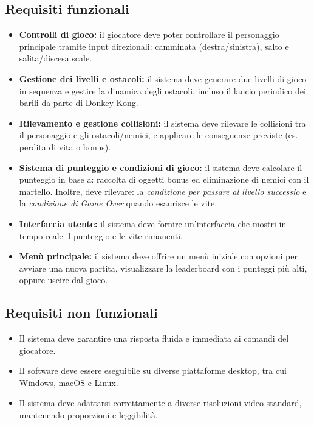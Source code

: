 \documentclass[a4paper,12pt]{report}
\begin{document}
\subsection*{Requisiti funzionali}
\begin{itemize}
	\item \textbf{Controlli di gioco:}
	      il giocatore deve poter controllare il personaggio principale tramite input direzionali: camminata (destra/sinistra), salto e salita/discesa scale.
	\item \textbf{Gestione dei livelli e ostacoli:}
	      il sistema deve generare due livelli di gioco in sequenza e gestire la dinamica degli ostacoli, incluso il lancio periodico dei barili da parte di Donkey Kong.
	\item \textbf{Rilevamento e gestione collisioni:}
	      il sistema deve rilevare le collisioni tra il personaggio e gli ostacoli/nemici, e applicare le conseguenze previste (es. perdita di vita o bonus).
	\item  \textbf{Sistema di punteggio e condizioni di gioco:}
	      il sistema deve calcolare il punteggio in base a: raccolta di oggetti bonus ed eliminazione di nemici con il martello.
	      Inoltre, deve rilevare: la \textit{condizione per passare al livello successio} e la \textit{condizione di Game Over} quando esaurisce le vite.
	\item \textbf{Interfaccia utente:}
	      il sistema deve fornire un'interfaccia che mostri in tempo reale il punteggio e  le vite rimanenti.
	\item \textbf{Menù principale:}
	      il sistema deve offrire un menù iniziale con opzioni per avviare una nuova partita, visualizzare la leaderboard con i punteggi più alti, oppure uscire dal gioco.
\end{itemize}

\subsection*{Requisiti non funzionali}
\begin{itemize}
	\item Il sistema deve garantire una risposta fluida e immediata ai comandi del giocatore.
	\item Il software deve essere eseguibile su diverse piattaforme desktop, tra cui Windows, macOS e Linux.
	\item Il sistema deve adattarsi correttamente a diverse risoluzioni video standard, mantenendo proporzioni e leggibilità.
\end{itemize}
\end{document}
